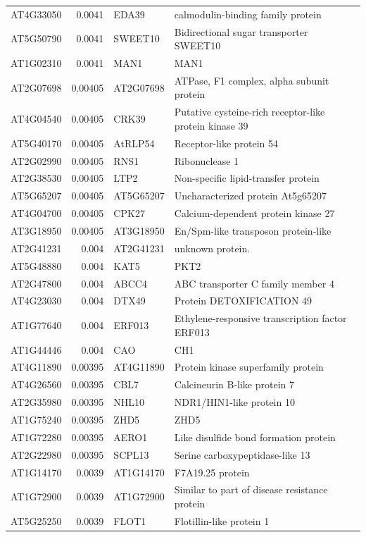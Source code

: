 \documentclass[11pt]{article}
\begin{document}
\begin{center}
\begin{tabular}{lrll}
AT4G33050 & 0.0041 & EDA39 & calmodulin-binding family protein\\
AT5G50790 & 0.0041 & SWEET10 & Bidirectional sugar transporter SWEET10\\
AT1G02310 & 0.0041 & MAN1 & MAN1\\
AT2G07698 & 0.00405 & AT2G07698 & ATPase, F1 complex, alpha subunit protein\\
AT4G04540 & 0.00405 & CRK39 & Putative cysteine-rich receptor-like protein kinase 39\\
AT5G40170 & 0.00405 & AtRLP54 & Receptor-like protein 54\\
AT2G02990 & 0.00405 & RNS1 & Ribonuclease 1\\
AT2G38530 & 0.00405 & LTP2 & Non-specific lipid-transfer protein\\
AT5G65207 & 0.00405 & AT5G65207 & Uncharacterized protein At5g65207\\
AT4G04700 & 0.00405 & CPK27 & Calcium-dependent protein kinase 27\\
AT3G18950 & 0.00405 & AT3G18950 & En/Spm-like transposon protein-like\\
AT2G41231 & 0.004 & AT2G41231 & unknown protein.\\
AT5G48880 & 0.004 & KAT5 & PKT2\\
AT2G47800 & 0.004 & ABCC4 & ABC transporter C family member 4\\
AT4G23030 & 0.004 & DTX49 & Protein DETOXIFICATION 49\\
AT1G77640 & 0.004 & ERF013 & Ethylene-responsive transcription factor ERF013\\
AT1G44446 & 0.004 & CAO & CH1\\
AT4G11890 & 0.00395 & AT4G11890 & Protein kinase superfamily protein\\
AT4G26560 & 0.00395 & CBL7 & Calcineurin B-like protein 7\\
AT2G35980 & 0.00395 & NHL10 & NDR1/HIN1-like protein 10\\
AT1G75240 & 0.00395 & ZHD5 & ZHD5\\
AT1G72280 & 0.00395 & AERO1 & Like disulfide bond formation protein\\
AT2G22980 & 0.00395 & SCPL13 & Serine carboxypeptidase-like 13\\
AT1G14170 & 0.0039 & AT1G14170 & F7A19.25 protein\\
AT1G72900 & 0.0039 & AT1G72900 & Similar to part of disease resistance protein\\
AT5G25250 & 0.0039 & FLOT1 & Flotillin-like protein 1\\

\end{tabular}
\end{center}
\end{document}
